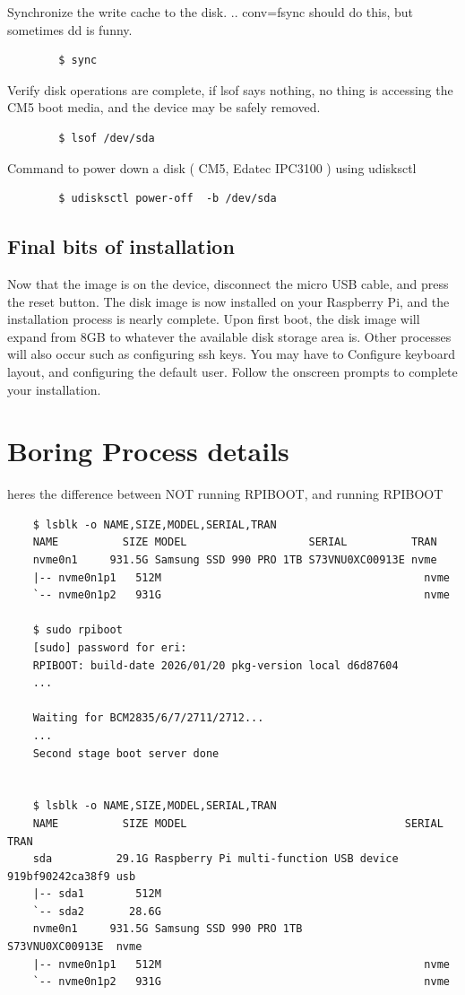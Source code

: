 \documentclass[]{article}
\begin{document}
	Synchronize the write cache to the disk. .. conv=fsync should do this, but sometimes dd is funny.
	
	\begin{verbatim}
		$ sync
	\end{verbatim}
	
	Verify disk operations are complete, if lsof says nothing, no thing is accessing the CM5 boot media, and the device may be safely removed.
	
	\begin{verbatim}
		$ lsof /dev/sda
	\end{verbatim}
	
	Command to power down a disk ( CM5, Edatec IPC3100 ) using udisksctl
		\begin{verbatim}
		$ udisksctl power-off  -b /dev/sda
	\end{verbatim}
	
	\subsection*{Final bits of installation}
	Now that the image is on the device, disconnect the micro USB cable, and press the reset button. 
	The disk image is now installed on your Raspberry Pi, and the installation process is nearly complete. 
	Upon first boot, the disk image will expand from 8GB to whatever the available disk storage area is. Other processes will also occur such as configuring ssh keys. You may have to Configure keyboard layout, and configuring the default user. Follow the onscreen prompts to complete your installation. 
	
	\section*{Boring Process details}
heres the difference between NOT running RPIBOOT, and running RPIBOOT

\begin{verbatim}
	$ lsblk -o NAME,SIZE,MODEL,SERIAL,TRAN
	NAME          SIZE MODEL                   SERIAL          TRAN
	nvme0n1     931.5G Samsung SSD 990 PRO 1TB S73VNU0XC00913E nvme
	|-- nvme0n1p1   512M                                         nvme
	`-- nvme0n1p2   931G                                         nvme
	
	$ sudo rpiboot 
	[sudo] password for eri:   
	RPIBOOT: build-date 2026/01/20 pkg-version local d6d87604	
	...
	
	Waiting for BCM2835/6/7/2711/2712...	
	...
	Second stage boot server done
	
	
	$ lsblk -o NAME,SIZE,MODEL,SERIAL,TRAN
	NAME          SIZE MODEL                                  SERIAL           TRAN
	sda          29.1G Raspberry Pi multi-function USB device 919bf90242ca38f9 usb
	|-- sda1        512M
	`-- sda2       28.6G
	nvme0n1     931.5G Samsung SSD 990 PRO 1TB                S73VNU0XC00913E  nvme
	|-- nvme0n1p1   512M                                         nvme
	`-- nvme0n1p2   931G                                         nvme
\end{verbatim}
\end{document}
